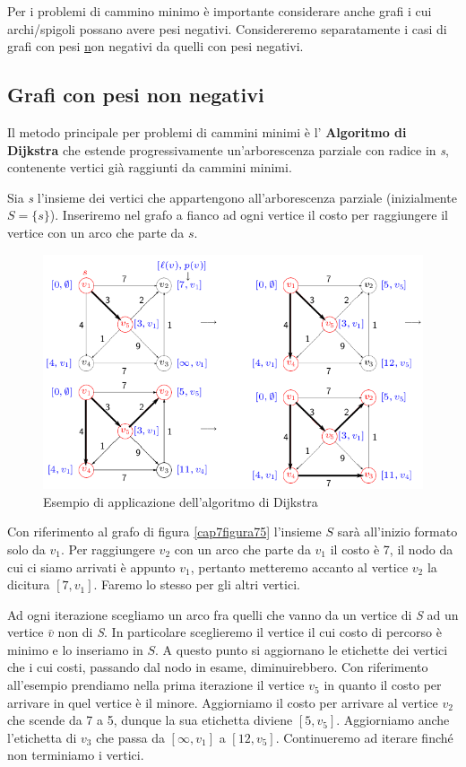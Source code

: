 \documentclass[11pt]{book}
\begin{document}
Per i problemi di cammino minimo \`e importante considerare anche
grafi i cui archi/spigoli possano avere pesi negativi. Considereremo
separatamente i casi di grafi con pesi {\underline non} negativi da
quelli con pesi negativi.


\subsection{Grafi con pesi non negativi}

Il metodo principale per problemi di cammini minimi \`e l'{\bf
  Algoritmo di Dijkstra} che estende progressivamente un'arborescenza
parziale con radice in {\em s}, contenente vertici gi\`a raggiunti da
cammini minimi. 

Sia {\em s} l'insieme dei vertici che appartengono all'arborescenza
parziale (inizialmente $S = \{s\}$). Inseriremo nel grafo a fianco ad
ogni vertice il costo per raggiungere il vertice con un arco che parte
da $s$.

\begin{figure}[H]
  \centering
  \includegraphics[width=\textwidth]{images/cap7fig75.png}
  \caption{Esempio di applicazione dell'algoritmo di Dijkstra}
  \label{cap7fig75}
\end{figure}


Con riferimento al grafo di figura \ref{cap7figura75} l'insieme $S$
sar\`a all'inizio formato solo da $v_1$. Per raggiungere $v_2$ con un
arco che parte da $v_1$ il costo \`e 7, il nodo da cui ci siamo
arrivati \`e appunto $v_1$, pertanto metteremo accanto al vertice
$v_2$ la dicitura $[7,v_1]$. Faremo lo stesso per gli altri vertici.


Ad ogni iterazione scegliamo un arco fra quelli che vanno da un
vertice di {\em S} ad un vertice $\bar{v}$ non di {\em S}. In
particolare sceglieremo il vertice il cui costo di percorso \`e minimo
e lo inseriamo in $S$. A questo punto si aggiornano le etichette dei
vertici che i cui costi, passando dal nodo in esame,
diminuirebbero. Con riferimento all'esempio prendiamo nella prima
iterazione il vertice $v_5$ in quanto il costo per arrivare in quel
vertice \`e il minore. Aggiorniamo il costo per arrivare al vertice
$v_2$ che scende da 7 a 5, dunque la sua etichetta diviene $[5,
  v_5]$. Aggiorniamo anche l'etichetta di $v_3$ che passa da $[\infty,
  v_1]$ a $[12, v_5]$. Continueremo ad iterare finch\'e non terminiamo
i vertici.
\end{document}
